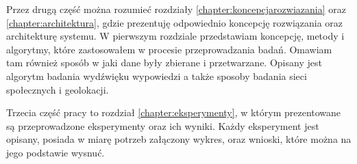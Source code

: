 Przez drugą część można rozumieć rozdziały \ref{chapter:koncepcjarozwiazania}
oraz \ref{chapter:architektura}, gdzie prezentuję odpowiednio koncepcję
rozwiązania oraz architekturę systemu. W pierwszym rozdziale
przedstawiam koncepcję, metody i algorytmy, które zastosowałem w procesie
przeprowadzania badań. Omawiam tam również sposób w jaki dane były zbierane
i przetwarzane. Opisany jest algorytm badania wydźwięku wypowiedzi a także
sposoby badania sieci społecznych i geolokacji.

Trzecia część pracy to rozdział \ref{chapter:eksperymenty}, w którym
prezentowane są przeprowadzone eksperymenty oraz ich wyniki.
Każdy eksperyment jest opisany, posiada w miarę potrzeb załączony wykres,
oraz wnioski, które można na jego podstawie wysnuć.
